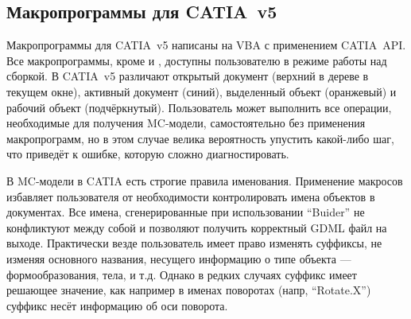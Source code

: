 \subsection{Макропрограммы для CATIA~v5}\label{sec:Macros}

Макропрограммы для CATIA~v5 написаны на VBA с применением CATIA~API. Все макропрограммы, кроме  и , доступны пользователю в режиме работы над сборкой. В CATIA~v5 различают открытый документ (верхний в дереве в текущем окне), активный документ (синий), выделенный объект (оранжевый) и рабочий объект (подчёркнутый). Пользователь может выполнить все операции, необходимые для получения MC-модели, самостоятельно без применения макропрограмм, но в этом случае велика вероятность упустить какой-либо шаг, что приведёт к ошибке, которую сложно диагностировать.

В MC-модели в CATIA есть строгие правила именования. Применение макросов избавляет пользователя от необходимости контролировать имена объектов в документах. Все имена, сгенерированные при использовании ``Buider'' не конфликтуют между собой и позволяют получить корректный GDML файл на выходе. Практически везде пользователь имеет право изменять суффиксы, не изменяя основного названия, несущего информацию о типе объекта --- формообразования, тела, и т.д. Однако в редких случаях суффикс имеет решающее значение, как например в именах поворотах (напр, ``Rotate.X'') суффикс несёт информацию об оси поворота.

